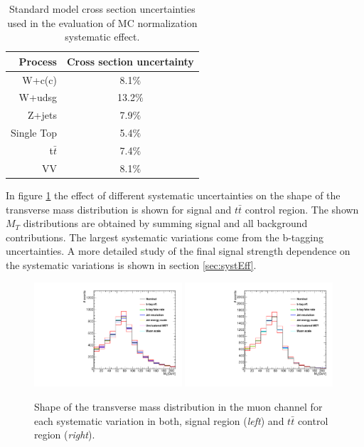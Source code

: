 \begin{table}[!htb]
\begin{center}
   \begin{tabular} {r c} \hline \hline
        Process         & Cross section uncertainty \\
        \hline
        W+c(c)          & 8.1$\%$ \\
        W+udsg          & 13.2$\%$ \\
        Z+jets          & 7.9$\%$ \\
        Single Top      & 5.4$\%$ \\
        t$\bar{t}$      & 7.4$\%$ \\
        VV              & 8.1$\%$ \\
        \hline\hline
   \end{tabular}
\caption{Standard model cross section uncertainties used in the evaluation of MC normalization systematic effect.}
\label{tab:SMunc}
\end{center}
\end{table}

In figure \ref{fig:shapeVar} the effect of different systematic uncertainties on the shape of the transverse mass distribution is shown for signal and $t\bar{t}$ control region. The shown $M_T$ distributions are obtained by summing signal and all background contributions. The largest systematic variations come from the b-tagging uncertainties. A more detailed study of the final signal strength dependence on the systematic variations is shown in section \ref{sec:systEff}.

\begin{figure}[htbp]
	\centering
		\includegraphics[width=0.49\textwidth]{Figures/syst_Wbb_var.pdf}
		\includegraphics[width=0.49\textwidth]{Figures/syst_TT_var.pdf}
	\caption[Shape of the transverse mass distribution for each systematic variation in both, signal region and $t\bar{t}$ control region.]{Shape of the transverse mass distribution in the muon channel for each systematic variation in both, signal region (\textit{left}) and $t\bar{t}$ control region (\textit{right}).}
	\label{fig:shapeVar}
\end{figure}

